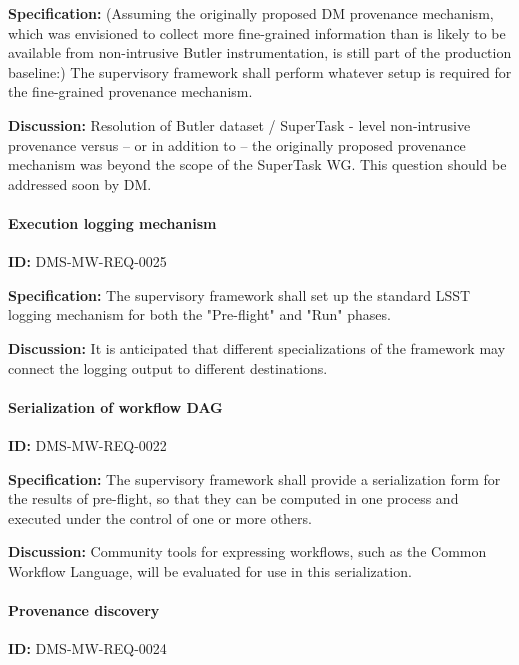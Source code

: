 \documentclass[SE,toc,lsstdraft]{lsstdoc}
\begin{document}
\textbf{Specification:}
(Assuming the originally proposed DM provenance mechanism, which was envisioned to collect more fine-grained information than is likely to be available from non-intrusive Butler instrumentation, is still part of the production baseline:) The supervisory framework shall perform whatever setup is required for the fine-grained provenance mechanism.

\textbf{Discussion:}
Resolution of Butler dataset / SuperTask - level non-intrusive provenance versus – or in addition to – the originally proposed provenance mechanism was beyond the scope of the SuperTask WG. This question should be addressed soon by DM.

\paragraph{Execution logging mechanism}\hfill  %

\label{DMS-MW-REQ-0025}
\textbf{ID:} DMS-MW-REQ-0025

\textbf{Specification:}
The supervisory framework shall set up the standard LSST logging mechanism for both the "Pre-flight" and "Run" phases.

\textbf{Discussion:}
It is anticipated that different specializations of the framework may connect the logging output to different destinations.

\paragraph{Serialization of workflow DAG}\hfill  %

\label{DMS-MW-REQ-0022}
\textbf{ID:} DMS-MW-REQ-0022

\textbf{Specification:}
The supervisory framework shall provide a serialization form for the results of pre-flight, so that they can be computed in one process and executed under the control of one or more others.

\textbf{Discussion:}
Community tools for expressing workflows, such as the Common Workflow Language, will be evaluated for use in this serialization.

\paragraph{Provenance discovery}\hfill  %

\label{DMS-MW-REQ-0024}
\textbf{ID:} DMS-MW-REQ-0024
\end{document}
